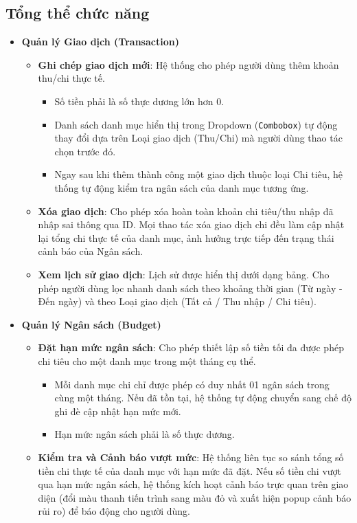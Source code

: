 \documentclass[12pt,letterpaper]{article}
\begin{document}
\subsection{Tổng thể chức năng}
\begin{itemize}
    \item \textbf{Quản lý Giao dịch (Transaction)}
    \begin{itemize}
        \item \textbf{Ghi chép giao dịch mới}: Hệ thống cho phép người dùng thêm khoản thu/chi thực tế. 
        \begin{itemize}
            \item Số tiền phải là số thực dương lớn hơn 0.
            \item Danh sách danh mục hiển thị trong Dropdown (\texttt{Combobox}) tự động thay đổi dựa trên Loại giao dịch (Thu/Chi) mà người dùng thao tác chọn trước đó.
            \item Ngay sau khi thêm thành công một giao dịch thuộc loại Chi tiêu, hệ thống tự động kiểm tra ngân sách của danh mục tương ứng.
        \end{itemize}
        \item \textbf{Xóa giao dịch}: Cho phép xóa hoàn toàn khoản chi tiêu/thu nhập đã nhập sai thông qua ID. Mọi thao tác xóa giao dịch chi đều làm cập nhật lại tổng chi thực tế của danh mục, ảnh hưởng trực tiếp đến trạng thái cảnh báo của Ngân sách.
        \item \textbf{Xem lịch sử giao dịch}: Lịch sử được hiển thị dưới dạng bảng. Cho phép người dùng lọc nhanh danh sách theo khoảng thời gian (Từ ngày - Đến ngày) và theo Loại giao dịch (Tất cả / Thu nhập / Chi tiêu).
    \end{itemize}
    \item \textbf{Quản lý Ngân sách (Budget)}
    \begin{itemize}
        \item \textbf{Đặt hạn mức ngân sách}: Cho phép thiết lập số tiền tối đa được phép chi tiêu cho một danh mục trong một tháng cụ thể.
        \begin{itemize}
            \item Mỗi danh mục chi chỉ được phép có duy nhất 01 ngân sách trong cùng một tháng. Nếu đã tồn tại, hệ thống tự động chuyển sang chế độ ghi đè cập nhật hạn mức mới.
            \item Hạn mức ngân sách phải là số thực dương.
        \end{itemize}
        \item \textbf{Kiểm tra và Cảnh báo vượt mức}: Hệ thống liên tục so sánh tổng số tiền chi thực tế của danh mục với hạn mức đã đặt. Nếu số tiền chi vượt qua hạn mức ngân sách, hệ thống kích hoạt cảnh báo trực quan trên giao diện (đổi màu thanh tiến trình sang màu đỏ và xuất hiện popup cảnh báo rủi ro) để báo động cho người dùng.

\end{itemize}
\end{itemize}
\end{document}
